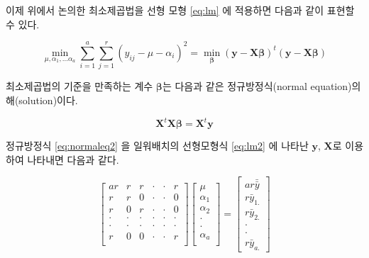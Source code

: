 \documentclass[
]{book}
\theoremstyle{definition}
\theoremstyle{definition}
\theoremstyle{definition}
\theoremstyle{definition}
\theoremstyle{remark}
\begin{document}
이제 위에서 논의한 최소제곱법을 선형 모형 \eqref{eq:lm} 에 적용하면 다음과 같이 표현할 수 있다.

\begin{equation} 
 \min_{\mu, \alpha_1, \dots \alpha_a} \sum_{i=1}^a \sum_{j=1}^r 
(y_{ij} - \mu -\alpha_i)^2 = \min_{\bm \beta } ( \bm y -  \bm X \bm \beta )^t( \bm y -  \bm X \bm \beta ) 
 \label{eq:rsq2}
 \end{equation}

최소제곱법의 기준을 만족하는 계수 \(\bm \beta\)는 다음과 같은 정규방정식(normal equation)의 해(solution)이다.

\begin{equation}
\bm X^t \bm X \bm \beta = \bm X^t \bm y
\label{eq:normaleq2}
\end{equation}

정규방정식 \eqref{eq:normaleq2} 을 일워배치의 선형모형식 \eqref{eq:lm2} 에 나타난 \(\bm y\), \(\bm X\)로 이용하여 나타내면 다음과 같다.

\begin{equation}
\begin{bmatrix}
ar   & r & r & \cdot & \cdot & r \\
r & r &  0  & \cdot & \cdot & 0 \\
r & 0   & r  & \cdot & \cdot & 0 \\
\cdot & \cdot   & \cdot  & \cdot & \cdot & \cdot \\
\cdot & \cdot   & \cdot  & \cdot & \cdot & \cdot \\
r & 0   &  0   & \cdot & \cdot & r \\
\end{bmatrix}
\begin{bmatrix}
\mu \\
\alpha_{1} \\
\alpha_{2} \\
\cdot \\
\cdot \\
\alpha_{a} \\
\end{bmatrix}
=
\begin{bmatrix}
ar \bar {\bar y} \\
r {\bar y}_{1.}\\
r \bar y_{2.}\\
\cdot \\
\cdot \\
r \bar y_{a.}
\end{bmatrix}
\label{eq:normaleq3}
\end{equation}
\end{document}
